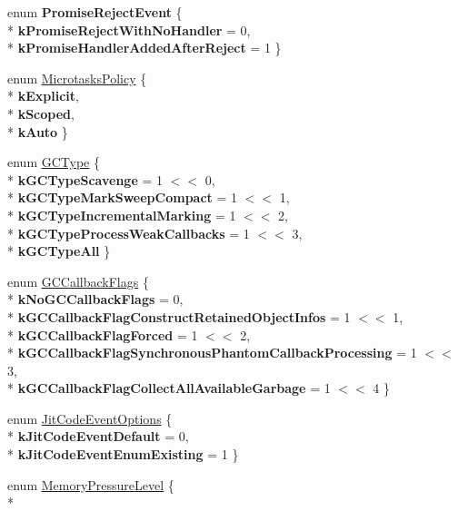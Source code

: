 \begin{DoxyCompactItemize}
\item 
enum {\bfseries Promise\+Reject\+Event} \{ \\*
{\bfseries k\+Promise\+Reject\+With\+No\+Handler} = 0, 
\\*
{\bfseries k\+Promise\+Handler\+Added\+After\+Reject} = 1
 \}\hypertarget{namespacev8_a307b3674d4966684f8170a4fbd932eaf}{}\label{namespacev8_a307b3674d4966684f8170a4fbd932eaf}

\item 
enum \hyperlink{namespacev8_a2f183b102b3d1b7a30a805e8c53c04da}{Microtasks\+Policy} \{ \\*
{\bfseries k\+Explicit}, 
\\*
{\bfseries k\+Scoped}, 
\\*
{\bfseries k\+Auto}
 \}
\item 
enum \hyperlink{namespacev8_ac109d6f27e0c0f9ef4e98bcf7a806cf2}{G\+C\+Type} \{ \\*
{\bfseries k\+G\+C\+Type\+Scavenge} = 1 $<$$<$ 0, 
\\*
{\bfseries k\+G\+C\+Type\+Mark\+Sweep\+Compact} = 1 $<$$<$ 1, 
\\*
{\bfseries k\+G\+C\+Type\+Incremental\+Marking} = 1 $<$$<$ 2, 
\\*
{\bfseries k\+G\+C\+Type\+Process\+Weak\+Callbacks} = 1 $<$$<$ 3, 
\\*
{\bfseries k\+G\+C\+Type\+All}
 \}
\item 
enum \hyperlink{namespacev8_a247c37a849f4d6c293b9b16e94e1944b}{G\+C\+Callback\+Flags} \{ \\*
{\bfseries k\+No\+G\+C\+Callback\+Flags} = 0, 
\\*
{\bfseries k\+G\+C\+Callback\+Flag\+Construct\+Retained\+Object\+Infos} = 1 $<$$<$ 1, 
\\*
{\bfseries k\+G\+C\+Callback\+Flag\+Forced} = 1 $<$$<$ 2, 
\\*
{\bfseries k\+G\+C\+Callback\+Flag\+Synchronous\+Phantom\+Callback\+Processing} = 1 $<$$<$ 3, 
\\*
{\bfseries k\+G\+C\+Callback\+Flag\+Collect\+All\+Available\+Garbage} = 1 $<$$<$ 4
 \}
\item 
enum \hyperlink{namespacev8_a06f34fa4fa4cfc8518366808d1d461c1}{Jit\+Code\+Event\+Options} \{ \\*
{\bfseries k\+Jit\+Code\+Event\+Default} = 0, 
\\*
{\bfseries k\+Jit\+Code\+Event\+Enum\+Existing} = 1
 \}
\item 
enum \hyperlink{namespacev8_ae0e9a25bf51e518585f555806e7dc7b9}{Memory\+Pressure\+Level} \{ \\*

\end{DoxyCompactItemize}
